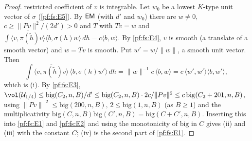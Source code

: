 \begin{proof}
restricted coefficient of $v$ is integrable. Let $w_0$ be a lowest $K$-type unit vector of $\sigma$ (\ref{pf:fs:E5}). By $\mathsf{EM}$ (with $d'$ and
$w_0$) there are $w\ne0$, $c\ge\|Pv\|^2/(2d')>0$ and $T$ with $Tv=w$ and
$\int\overline{\langle v,\pi(\tilde h)v\rangle}\langle b,\sigma(h)w\rangle\,dh=c\langle b,w\rangle$. By \ref{pf:fs:E4}, $v$ is smooth (a translate
of a smooth vector) and $w=Tv$ is smooth. Put $w'=w/\|w\|$, a smooth unit vector. Then
\[
\int\overline{\langle v,\pi(\tilde h)v\rangle}\,\langle b,\sigma(h)w'\rangle\,dh=\|w\|^{-1}c\,\langle b,w\rangle=c\,\langle w',w'\rangle\langle b,w'\rangle,
\]
which is (i). By \ref{pf:fs:E3}, $\vol(\mathcal U_{1/4})\le\mathrm{big}(C_2,n,B)/d'\le\mathrm{big}(C_2,n,B)\cdot2c/\|Pv\|^2
\le c\,\mathrm{big}(C_2+201,n,B)$, using $\|Pv\|^{-2}\le\mathrm{big}(200,n,B)$, $2\le\mathrm{big}(1,n,B)$ (as $B\ge1$) and the multiplicativity
$\mathrm{big}(C,n,B)\mathrm{big}(C',n,B)=\mathrm{big}(C+C',n,B)$. Inserting this into \ref{pf:fs:E1} and \ref{pf:fs:E2} and using the monotonicity
of $\mathrm{big}$ in $C$ gives (ii) and (iii) with the constant $C$; (iv) is the second part of \ref{pf:fs:E1}.
\end{proof}


